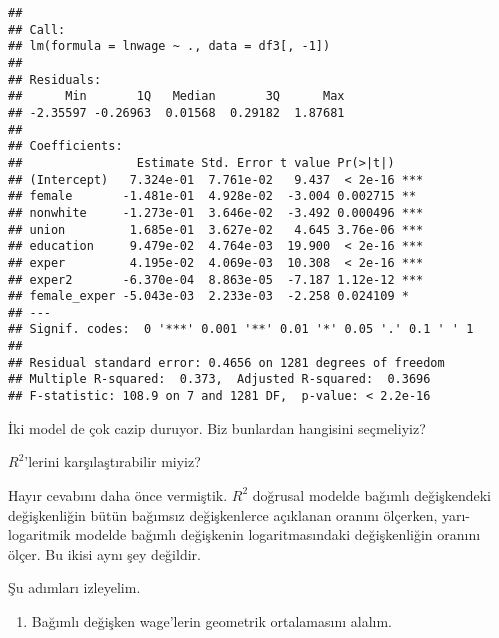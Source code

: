 \documentclass[
]{book}
\newenvironment{Shaded}{\begin{snugshade}}{\end{snugshade}}
\newcommand{\CommentTok}[1]{\textcolor[rgb]{0.56,0.35,0.01}{\textit{#1}}}
\newcommand{\DataTypeTok}[1]{\textcolor[rgb]{0.13,0.29,0.53}{#1}}
\newcommand{\DecValTok}[1]{\textcolor[rgb]{0.00,0.00,0.81}{#1}}
\newcommand{\KeywordTok}[1]{\textcolor[rgb]{0.13,0.29,0.53}{\textbf{#1}}}
\newcommand{\NormalTok}[1]{#1}
\newcommand{\OperatorTok}[1]{\textcolor[rgb]{0.81,0.36,0.00}{\textbf{#1}}}
\newcommand{\StringTok}[1]{\textcolor[rgb]{0.31,0.60,0.02}{#1}}
\providecommand{\tightlist}{%
  \setlength{\itemsep}{0pt}\setlength{\parskip}{0pt}}
\begin{document}
\begin{Shaded}
\end{Shaded}

\begin{verbatim}
## 
## Call:
## lm(formula = lnwage ~ ., data = df3[, -1])
## 
## Residuals:
##      Min       1Q   Median       3Q      Max 
## -2.35597 -0.26963  0.01568  0.29182  1.87681 
## 
## Coefficients:
##                Estimate Std. Error t value Pr(>|t|)    
## (Intercept)   7.324e-01  7.761e-02   9.437  < 2e-16 ***
## female       -1.481e-01  4.928e-02  -3.004 0.002715 ** 
## nonwhite     -1.273e-01  3.646e-02  -3.492 0.000496 ***
## union         1.685e-01  3.627e-02   4.645 3.76e-06 ***
## education     9.479e-02  4.764e-03  19.900  < 2e-16 ***
## exper         4.195e-02  4.069e-03  10.308  < 2e-16 ***
## exper2       -6.370e-04  8.863e-05  -7.187 1.12e-12 ***
## female_exper -5.043e-03  2.233e-03  -2.258 0.024109 *  
## ---
## Signif. codes:  0 '***' 0.001 '**' 0.01 '*' 0.05 '.' 0.1 ' ' 1
## 
## Residual standard error: 0.4656 on 1281 degrees of freedom
## Multiple R-squared:  0.373,  Adjusted R-squared:  0.3696 
## F-statistic: 108.9 on 7 and 1281 DF,  p-value: < 2.2e-16
\end{verbatim}

İki model de çok cazip duruyor. Biz bunlardan hangisini seçmeliyiz?

\(R^2\)'lerini karşılaştırabilir miyiz?

Hayır cevabını daha önce vermiştik. \(R^2\) doğrusal modelde bağımlı değişkendeki değişkenliğin bütün bağımsız değişkenlerce açıklanan oranını ölçerken, yarı-logaritmik modelde bağımlı değişkenin logaritmasındaki değişkenliğin oranını ölçer. Bu ikisi aynı şey değildir.

Şu adımları izleyelim.

\begin{enumerate}
\def\labelenumi{\roman{enumi}.}
\tightlist
\item
  Bağımlı değişken wage'lerin geometrik ortalamasını alalım.
\end{enumerate}

\begin{Shaded}
\end{Shaded}
\end{document}
